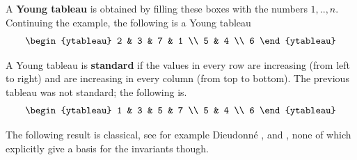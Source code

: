 \documentclass{scrartcl}
\theoremstyle{plain}
\theoremstyle{definition}
\newcommand{\1}[1]{1_{\{#1\}}}
\begin{document}
A \textbf{Young tableau} is obtained by filling these boxes with the numbers $1, .., n$.
Continuing the example, the following is a Young tableau
\begin{align*}
  \begin{ytableau}
    2  & 3 & 7  & 1 \\
    5  & 4  \\
    6 
  \end{ytableau}
\end{align*}

A Young tableau is \textbf{standard} if the values in every row are increasing (from left to right)
and are increasing in every column (from top to bottom). The previous tableau was not standard; the following is.
\begin{align*}
  \begin{ytableau}
    1  & 3 & 5  & 7 \\
    5  & 4  \\
    6 
  \end{ytableau}
\end{align*}

The following result is classical,
see for example Dieudonn\'e \cite[Section 2.5]{bib:DC1970}, \cite{bib:Wey1946} and \cite{bib:Gar1975},
none of which explicitly give a basis for the invariants though.
\end{document}
